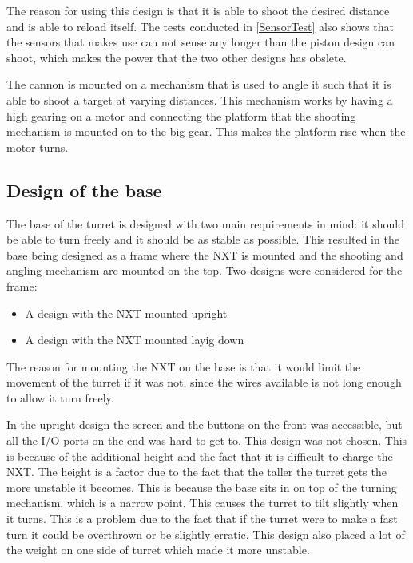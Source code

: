 The reason for using this design is that it is able to shoot the desired
distance and is able to reload itself. The tests conducted in
\autoref{SensorTest} also shows that the sensors that \name makes use can not
sense any longer than the piston design can shoot, which makes the power that
the two other designs has obslete.\nl

The cannon is mounted on a mechanism that is used to angle it such that it
is able to shoot a target at varying distances. This mechanism works by having a
high gearing on a motor and connecting the platform that the shooting mechanism
is mounted on to the big gear. This makes the platform rise when the motor
turns.

\subsection{Design of the base}
The base of the turret is designed with two main requirements in mind: it should
be able to turn freely and it should be as stable as possible. This resulted
in the base being designed as a frame where the NXT is mounted and the shooting
and angling mechanism are mounted on the top. Two designs were considered for the frame: 

\begin{itemize}
  \item A design with the NXT mounted upright
  \item A design with the NXT mounted layig down
\end{itemize}

The reason for mounting the NXT on the base is that it would limit the movement
of the turret if it was not, since the wires available is not long enough to
allow it turn freely.\nl

In the upright design the screen and the buttons on the front
was accessible, but all the I/O ports on the end was hard to get to. This
design was not chosen. This is because of the additional height and the fact
that it is difficult to charge the NXT. The height is a factor due to the fact
that the taller the turret gets the more unstable it becomes. This is because
the base sits in on top of the turning mechanism, which is a narrow point. This
causes the turret to tilt slightly when it turns. This is a problem due to the
fact that if the turret were to make a fast turn it could be overthrown or be
slightly erratic. This design also placed a lot of the weight on one side of
turret which made it more unstable.\nl

